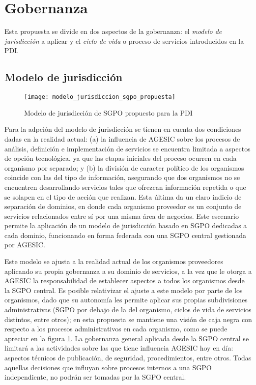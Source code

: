 \section{Gobernanza}
  \label{Solucion:Gobernanza}

  Esta propuesta se divide en dos aspectos de la gobernanza: el \emph{modelo de jurisdicción} a aplicar y el \emph{ciclo de vida} o proceso de servicios introducidos en la PDI.

  \subsection{Modelo de jurisdicción}
    \label{Solucion:Gobernanza:ModeloJurisdiccion}

    \begin{figure}
      \centering
      \texttt{[image: modelo\_jurisdiccion\_sgpo\_propuesta]}
      \caption{Modelo de jurisdicción de SGPO propuesto para la PDI}
      \label{Figura:ModeloJurisdiccionSGPOPropuesta}
    \end{figure}

    Para la adpción del modelo de jurisdicción se tienen en cuenta dos condiciones dadas en la realidad actual: (a) la influencia de AGESIC sobre los procesos de análisis, definición e implementación de servicios se encuentra limitada a aspectos de opción tecnológica, ya que las etapas iniciales del proceso ocurren en cada organismo por separado; y (b) la división de caracter político de los organismos coincide con las del tipo de información, asegurando que dos organismos no se encuentren desarrollando servicios tales que ofrezcan información repetida o que se solapen en el tipo de acción que realizan. Esta última da un claro indicio de separación de dominios, en donde cada organismo proveedor es un conjunto de servicios relacionados entre sí por una misma área de negocios. Este escenario permite la aplicación de un modelo de jurisdicción basado en SGPO dedicadas a cada dominio, funcionando en forma federada con una SGPO central gestionada por AGESIC.

    Este modelo se ajusta a la realidad actual de los organismos proveedores aplicando su propia gobernanza a su dominio de servicios, a la vez que le otorga a AGESIC la responsabilidad de establecer aspectos a todos los organismos desde la SGPO central. Es posible relativizar el ajuste a este modelo por parte de los organismos, dado que su autonomía les permite aplicar sus propias subdivisiones administrativas (SGPO por debajo de la del organismo, ciclos de vida de servicios distintos, entre otros); en esta propuesta se mantiene una visión de caja negra con respecto a los procesos administrativos en cada organismo, como se puede apreciar en la figura \ref{Figura:ModeloJurisdiccionSGPOPropuesta}. La gobernanza general aplicada desde la SGPO central se limitará a las actividades sobre las que tiene influencia AGESIC hoy en día: aspectos técnicos de publicación, de seguridad, procedimientos, entre otros. Todas aquellas decisiones que influyan sobre procesos internos a una SGPO independiente, no podrán ser tomadas por la SGPO central.

